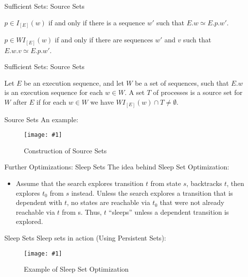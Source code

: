 \documentclass[9pt]{beamer}
\newcommand{\trace}[2]{
\begin{figure}[H]
\centering
\texttt{[image: \#1]}
\caption{#2}
\label{#2}
\end{figure}
}
\begin{document}
\begin{frame}{Sufficient Sets: Source Sets}

\begin{definition}
    $p \in I_{[E]}(w)$ if and only if there is a sequence $w'$ such that $E.w \simeq E.p.w'$.
\end{definition}


\begin{definition}
    $p \in WI_{[E]}(w)$ if and only if there are sequences $w'$ and $v$ such
that $E.w.v \simeq E.p.w'$.
\end{definition}
    
\end{frame}


\begin{frame}{Sufficient Sets: Source Sets}

\begin{definition}
Let $E$ be an execution sequence,
and let $W$ be a set of sequences, such that $E.w$ is an execution
sequence for each $w \in W$. A set $T$ of processes is a source set for
$W$ after $E$ if for each $w \in W$ we have $WI_{[E]}(w) \cap T  \neq \emptyset$.
\end{definition}

\end{frame}

\begin{frame}{Source Sets}
An example:
\trace{../img/source.pdf}{Construction of Source Sets}
\end{frame}

\begin{frame}{Further Optimizations: Sleep Sets}
The idea behind Sleep Set Optimization:

\begin{itemize}
\item Assume that the search explores transition $t$ from state $s$, backtracks $t$, then explores $t_0$ from $s$ instead.
Unless the search explores a transition that is dependent with $t$, no states are reachable via $t_0$ that were not
already reachable via $t$ from s. Thus, $t$ ``sleeps'' unless a dependent transition is explored.
    
\end{itemize}
\end{frame}

\begin{frame}{Sleep Sets}
Sleep sets in action (Using Persistent Sets):
\trace{../img/sleep.pdf}{Example of Sleep Set Optimization}
\end{frame}
\end{document}
